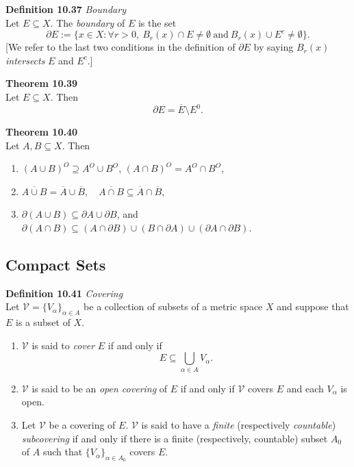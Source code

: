 \documentclass[8pt,landscape]{article}
\begin{document}
\begin{multicols}{3}
\textbf{Definition 10.37} \emph{Boundary} \\
Let $E \subseteq X$.
The \emph{boundary} of $E$ is the set
\[
    \partial E := \{x \in X : \forall r > 0, \ B_r(x) \cap E \neq \emptyset \
    \text{and} \ B_r(x) \cup E^c \neq \emptyset \}.
\]
[We refer to the last two conditions in the definition of $\partial E$ by saying
$B_r(x)$ \emph{intersects} $E$ and $E^c$.]


\textbf{Theorem 10.39} \\
Let $E \subseteq X$.
Then
\[
    \partial E = \overline{E} \setminus E^0.
\]


\textbf{Theorem 10.40} \\
Let $A, B \subseteq X$.
Then
\begin{enumerate}
    \item ${(A \cup B)}^O \supseteq A^O \cup B^O$, \quad
        ${(A \cap B)}^O = A^O \cap B^O$,
    \item $\overline{A \cup B} = \overline{A} \cup \overline{B}, \quad
        \overline{A \cap B} \subseteq \overline{A} \cap \overline{B}$,
    \item $\partial (A \cup B) \subseteq \partial A \cup \partial B$, \quad and \quad
        $\partial (A \cap B) \subseteq (A \cap \partial B) \cup (B \cap \partial A) \cup
        (\partial A \cap \partial B)$.
\end{enumerate}

\subsection{Compact Sets}

\textbf{Definition 10.41} \emph{Covering} \\
Let $\mathcal{V} = {\{V_\alpha\}}_{\alpha \in A}$ be a collection of subsets of a
metric space $X$ and suppose that $E$ is a subset of $X$.
\begin{enumerate}
    \item $\mathcal{V}$ is said to \emph{cover} $E$ if and only if
        \[
            E \subseteq \bigcup_{\alpha \in A} V_\alpha.
        \]

    \item $\mathcal{V}$ is said to be an \emph{open covering} of $E$ if and only if
        $\mathcal{V}$ covers $E$ and each $V_\alpha$ is open.
    \item Let $\mathcal{V}$ be a covering of $E$.
        $\mathcal{V}$ is said to have a \emph{finite} (respectively \emph{countable})
        \emph{subcovering} if and only if there is a finite (respectively, countable)
        subset $A_0$ of $A$ such that ${\{V_\alpha\}}_{\alpha \in A_0}$ covers $E$.
\end{enumerate}



\end{multicols}
\end{document}
